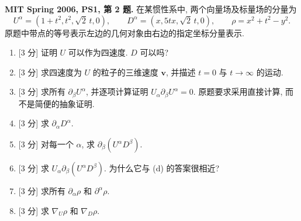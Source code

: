 \begin{exercise}
\textbf{MIT Spring 2006, PS1, 第 2 题.} 在某惯性系中, 两个向量场及标量场的分量为
\[
 U^\alpha=(1+t^2,t^2,\sqrt2\,t,0),\qquad
 D^\alpha=(x,5tx,\sqrt2\,t,0),\qquad
 \rho=x^2+t^2-y^2.
\]
原题中带点的等号表示左边的几何对象由右边的指定坐标分量表示.
\begin{enumerate}[label=(\alph*)]
\item \textnormal{[3 分]} 证明 $U$ 可以作为四速度. $D$ 可以吗?
\item \textnormal{[3 分]} 求四速度为 $U$ 的粒子的三维速度 $\boldsymbol v$, 并描述 $t=0$ 与 $t\to\infty$ 的运动.
\item \textnormal{[3 分]} 求所有 $\partial_\beta U^\alpha$, 并逐项计算证明 $U_\alpha\partial_\beta U^\alpha=0$. 原题要求采用直接计算, 而不是简便的抽象证明.
\item \textnormal{[3 分]} 求 $\partial_\alpha D^\alpha$.
\item \textnormal{[3 分]} 对每一个 $\alpha$, 求 $\partial_\beta(U^\alpha D^\beta)$.
\item \textnormal{[3 分]} 求 $U_\alpha\partial_\beta(U^\alpha D^\beta)$. 为什么它与 (d) 的答案很相近?
\item \textnormal{[3 分]} 求所有 $\partial_\alpha\rho$ 和 $\partial^\alpha\rho$.
\item \textnormal{[3 分]} 求 $\nabla_U\rho$ 和 $\nabla_D\rho$.
\end{enumerate}
\end{exercise}

